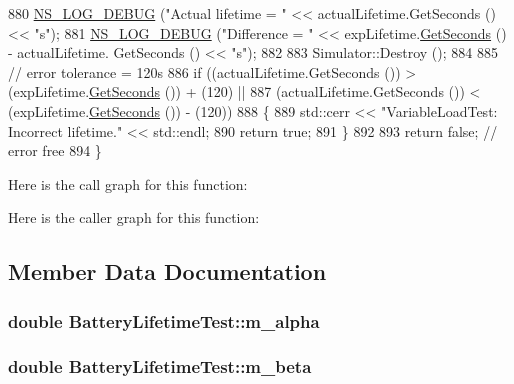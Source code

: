 \begin{DoxyCode}
880   \hyperlink{group__logging_ga413f1886406d49f59a6a0a89b77b4d0a}{NS\_LOG\_DEBUG} (\textcolor{stringliteral}{"Actual lifetime = "} << actualLifetime.GetSeconds () << \textcolor{stringliteral}{"s"});
881   \hyperlink{group__logging_ga413f1886406d49f59a6a0a89b77b4d0a}{NS\_LOG\_DEBUG} (\textcolor{stringliteral}{"Difference = "} << expLifetime.\hyperlink{classns3_1_1Time_a8f20d5c3b0902d7b4320982f340b57c8}{GetSeconds} () - actualLifetime.
      GetSeconds () << \textcolor{stringliteral}{"s"});
882 
883   Simulator::Destroy ();
884 
885   \textcolor{comment}{// error tolerance = 120s}
886   \textcolor{keywordflow}{if} ((actualLifetime.GetSeconds ()) > (expLifetime.\hyperlink{classns3_1_1Time_a8f20d5c3b0902d7b4320982f340b57c8}{GetSeconds} ()) + (120) ||
887       (actualLifetime.GetSeconds ()) < (expLifetime.\hyperlink{classns3_1_1Time_a8f20d5c3b0902d7b4320982f340b57c8}{GetSeconds} ()) - (120))
888     \{
889       std::cerr << \textcolor{stringliteral}{"VariableLoadTest: Incorrect lifetime."} << std::endl;
890       \textcolor{keywordflow}{return} \textcolor{keyword}{true};
891     \}
892 
893   \textcolor{keywordflow}{return} \textcolor{keyword}{false};   \textcolor{comment}{// error free}
894 \}
\end{DoxyCode}


Here is the call graph for this function\+:




Here is the caller graph for this function\+:




\subsection{Member Data Documentation}
\subsubsection[{\texorpdfstring{m\+\_\+alpha}{m_alpha}}]{\setlength{\rightskip}{0pt plus 5cm}double Battery\+Lifetime\+Test\+::m\+\_\+alpha}\hypertarget{classBatteryLifetimeTest_ab0ea71a3ce518e4876ee4a0efe8a967c}{}\label{classBatteryLifetimeTest_ab0ea71a3ce518e4876ee4a0efe8a967c}
\subsubsection[{\texorpdfstring{m\+\_\+beta}{m_beta}}]{\setlength{\rightskip}{0pt plus 5cm}double Battery\+Lifetime\+Test\+::m\+\_\+beta}\hypertarget{classBatteryLifetimeTest_a7e071f34e550450909e80907d59923c8}{}\label{classBatteryLifetimeTest_a7e071f34e550450909e80907d59923c8}
